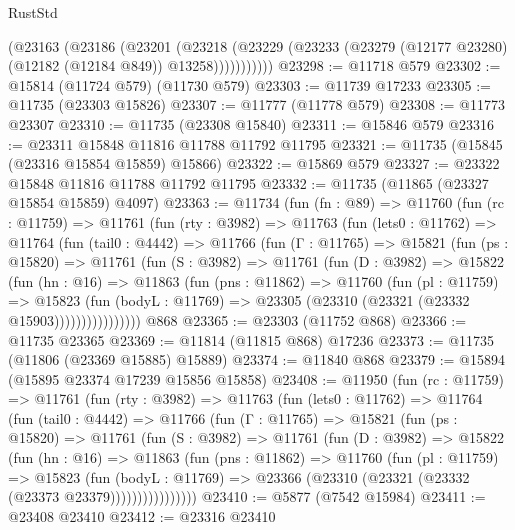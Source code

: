 \begin{lexlean}{RustStd}
\begin{coremodule}
            (@23163
              (@23186
                (@23201
                  (@23218
                    (@23229 (@23233 (@23279 (@12177 @23280) (@12182 (@12184 @849)) @13258)))))))))))
@23298 := @11718 @579
@23302 := @15814 (@11724 @579) (@11730 @579)
@23303 := @11739 @17233
@23305 := @11735 (@23303 @15826)
@23307 := @11777 (@11778 @579)
@23308 := @11773 @23307
@23310 := @11735 (@23308 @15840)
@23311 := @15846 @579
@23316 := @23311 @15848 @11816 @11788 @11792 @11795
@23321 := @11735 (@15845 (@23316 @15854 @15859) @15866)
@23322 := @15869 @579
@23327 := @23322 @15848 @11816 @11788 @11792 @11795
@23332 := @11735 (@11865 (@23327 @15854 @15859) @4097)
@23363 := @11734
    (fun (fn : @89) =>
    @11760
      (fun (rc : @11759) =>
      @11761
        (fun (rty : @3982) =>
        @11763
          (fun (lets0 : @11762) =>
          @11764
            (fun (tail0 : @4442) =>
            @11766
              (fun (Γ : @11765) =>
              @15821
                (fun (ps : @15820) =>
                @11761
                  (fun (S : @3982) =>
                  @11761
                    (fun (D : @3982) =>
                    @15822
                      (fun (hn : @16) =>
                      @11863
                        (fun (pns : @11862) =>
                        @11760
                          (fun (pl : @11759) =>
                          @15823
                            (fun (bodyL : @11769) =>
                            @23305 (@23310 (@23321 (@23332 @15903))))))))))))))))
    @868
@23365 := @23303 (@11752 @868)
@23366 := @11735 @23365
@23369 := @11814 (@11815 @868) @17236
@23373 := @11735 (@11806 (@23369 @15885) @15889)
@23374 := @11840 @868
@23379 := @15894 (@15895 @23374 @17239 @15856 @15858)
@23408 := @11950
    (fun (rc : @11759) =>
    @11761
      (fun (rty : @3982) =>
      @11763
        (fun (lets0 : @11762) =>
        @11764
          (fun (tail0 : @4442) =>
          @11766
            (fun (Γ : @11765) =>
            @15821
              (fun (ps : @15820) =>
              @11761
                (fun (S : @3982) =>
                @11761
                  (fun (D : @3982) =>
                  @15822
                    (fun (hn : @16) =>
                    @11863
                      (fun (pns : @11862) =>
                      @11760
                        (fun (pl : @11759) =>
                        @15823
                          (fun (bodyL : @11769) =>
                          @23366 (@23310 (@23321 (@23332 (@23373 @23379))))))))))))))))
@23410 := @5877 (@7542 @15984)
@23411 := @23408 @23410
@23412 := @23316 @23410

\end{coremodule}
\end{lexlean}
